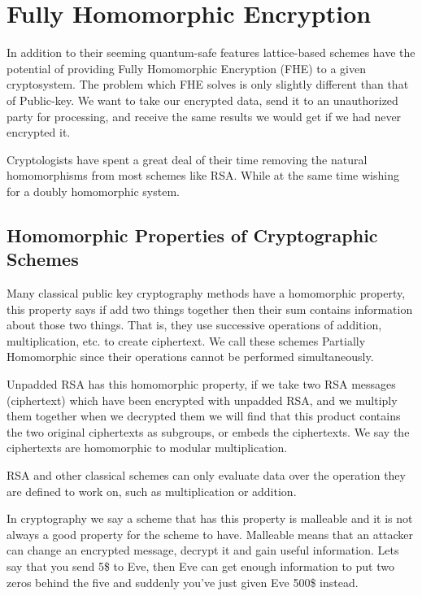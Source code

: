 \section{Fully Homomorphic Encryption} 

In addition to their seeming quantum-safe features lattice-based schemes have the potential of providing Fully Homomorphic Encryption (FHE) to a given cryptosystem. 
The problem which FHE solves is only slightly different than that of Public-key. We want to take our encrypted data, send it to an unauthorized party for processing, 
and receive the same results we would get if we had never encrypted it.

Cryptologists have spent a great deal of their time removing the natural homomorphisms from most schemes like RSA. While at the same time wishing for a doubly homomorphic system. 




\subsection{Homomorphic Properties of Cryptographic Schemes} 

Many classical public key cryptography methods have a homomorphic property, this property says if add two things together then their sum contains information about those two things.
That is, they use successive operations of addition, multiplication, etc. to create ciphertext. 
We call these schemes Partially Homomorphic since their operations cannot be performed simultaneously. 

Unpadded RSA has this homomorphic property, if we take two RSA messages (ciphertext) which have been encrypted with unpadded RSA, and we multiply them together when we decrypted them we will find that this product contains the two original ciphertexts as subgroups, or embeds the ciphertexts. We say the ciphertexts are homomorphic to modular multiplication. 

RSA and other classical schemes can only evaluate data over the operation they are defined to work on, such as multiplication or addition. 

In cryptography we say a scheme that has this property is malleable and it is not always a good property for the scheme to have. Malleable means that an attacker can change an encrypted message, decrypt it and gain useful information. Lets say that you send 5\$ to Eve, then Eve can get enough information to put two zeros behind the five and suddenly you’ve just given Eve 500\$ instead. 

